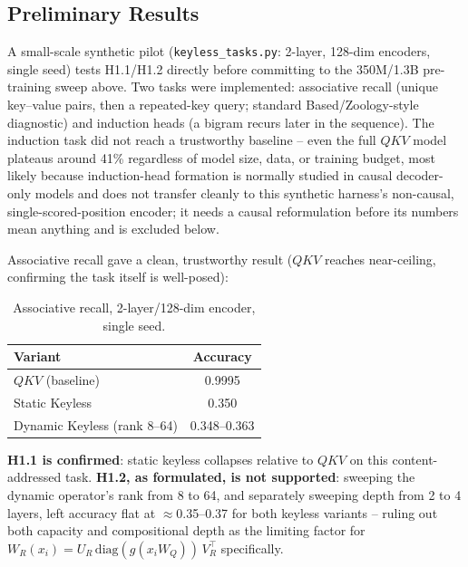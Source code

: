 \documentclass[11pt,a4paper]{article}
\begin{document}
\subsection{Preliminary Results}
\label{sec:track1-prelim}

A small-scale synthetic pilot (\texttt{keyless\_tasks.py}: 2-layer, 128-dim
encoders, single seed) tests H1.1/H1.2 directly before committing to the
350M/1.3B pre-training sweep above. Two tasks were implemented: associative
recall (unique key--value pairs, then a repeated-key query; standard
Based/Zoology-style diagnostic) and induction heads (a bigram recurs later in
the sequence). The induction task did not reach a trustworthy baseline --
even the full $QKV$ model plateaus around 41\% regardless of model size,
data, or training budget, most likely because induction-head formation is
normally studied in causal decoder-only models and does not transfer cleanly
to this synthetic harness's non-causal, single-scored-position encoder; it
needs a causal reformulation before its numbers mean anything and is
excluded below.

Associative recall gave a clean, trustworthy result ($QKV$ reaches
near-ceiling, confirming the task itself is well-posed):

\begin{table}[h]
\centering
\begin{tabular}{lc}
\toprule
Variant & Accuracy \\
\midrule
$QKV$ (baseline) & 0.9995 \\
Static Keyless & 0.350 \\
Dynamic Keyless (rank 8--64) & 0.348--0.363 \\
\bottomrule
\end{tabular}
\caption{Associative recall, 2-layer/128-dim encoder, single seed.}
\end{table}

\textbf{H1.1 is confirmed}: static keyless collapses relative to $QKV$ on this
content-addressed task. \textbf{H1.2, as formulated, is not supported}: sweeping
the dynamic operator's rank from 8 to 64, and separately sweeping depth from
2 to 4 layers, left accuracy flat at $\approx$0.35--0.37 for both keyless
variants -- ruling out both capacity and compositional depth as the limiting
factor for $W_R(x_i) = U_R\,\mathrm{diag}(g(x_iW_Q))\,V_R^\top$ specifically.
\end{document}
